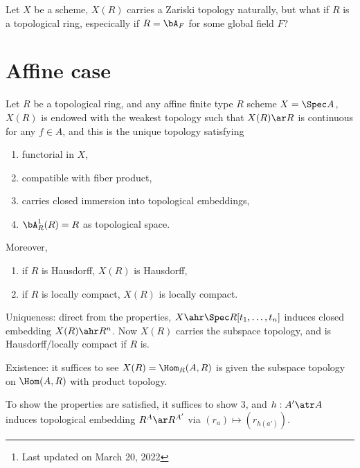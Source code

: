 

\title{}
\author{ by Cong Wen, 03/2022}
\date{}


\maketitle
\thispagestyle{empty}
\begin{abstract}
  This is my self-use notes\footnote{Last updated on March 20, 2022} on \cite{Conrad2012}. Please reach out if you find anything incorrect.
\end{abstract}
\tableofcontents



\begin{qst}
  Let $X$ be a scheme, $X(R)$ carries a Zariski topology naturally, but what if $R$ is a topological ring, especically if $R=\bA_{F}$ for some global field $F$?
\end{qst}

\section{Affine case}

\begin{prp}\label{prp:AffineCase}
  Let $R$ be a topological ring, and any affine finite type $R$ scheme $X=\Spec A$, $X(R)$ is endowed with the weakest topology such that $X(R)\ar R$ is continuous for any $f\in A$, and this is the unique topology satisfying
  \begin{enumerate}
    \item functorial in $X$,
    \item compatible with fiber product,
    \item carries closed immersion into topological embeddings,
    \item $\bA_{R}^{1}(R)=R$ as topological space.
  \end{enumerate}
  Moreover,
  \begin{enumerate}
    \item if $R$ is Hausdorff, $X(R)$ is Hausdorff,
    \item if $R$ is locally compact, $X(R)$ is locally compact.
  \end{enumerate}
\end{prp}

\begin{prf}
  Uniqueness: direct from the properties, $X\ahr\Spec R[t_{1},\ldots,t_{n}]$ induces closed embedding $X(R)\ahr R^{n}$. Now $X(R)$ carries the subspace topology, and is Hausdorff/locally compact if $R$ is.


  Existence: it suffices to see $X(R)=\Hom_{R}(A,R)$ is given the subspace topology on $\Hom(A,R)$ with product topology.


  To show the properties are satisfied, it suffices to show 3, and $h:A'\atr A$ induces topological embedding $R^{A}\ar R^{A'}$ via $(r_{a})\mapsto (r_{h(a')})$.
\end{prf}

